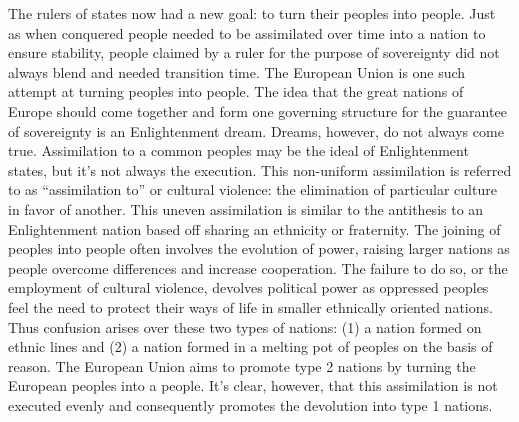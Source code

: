 \documentclass[a4paper, 12pt]{article}
\begin{document}
The rulers of states now had a new goal: to turn their peoples into people. Just as when conquered people needed to be assimilated over time into a nation to ensure stability, people claimed by a ruler for the purpose of sovereignty did not always blend and needed transition time. The European Union is one such attempt at turning peoples into people. The idea that the great nations of Europe should come together and form one governing structure for the guarantee of sovereignty is an Enlightenment dream. Dreams, however, do not always come true. Assimilation to a common peoples may be the ideal of Enlightenment states, but it's not always the execution. This non-uniform assimilation is referred to as ``assimilation to'' or cultural violence: the elimination of particular culture in favor of another. This uneven assimilation is similar to the antithesis to an Enlightenment nation based off sharing an ethnicity or fraternity. The joining of peoples into people often involves the evolution of power, raising larger nations as people overcome differences and increase cooperation. The failure to do so, or the employment of cultural violence, devolves political power as oppressed peoples feel the need to protect their ways of life in smaller ethnically oriented nations. Thus confusion arises over these two types of nations: (1) a nation formed on ethnic lines and (2) a nation formed in a melting pot of peoples on the basis of reason. The European Union aims to promote type 2 nations by turning the European peoples into a people. It's clear, however, that this assimilation is not executed evenly and consequently promotes the devolution into type 1 nations.
\end{document}
